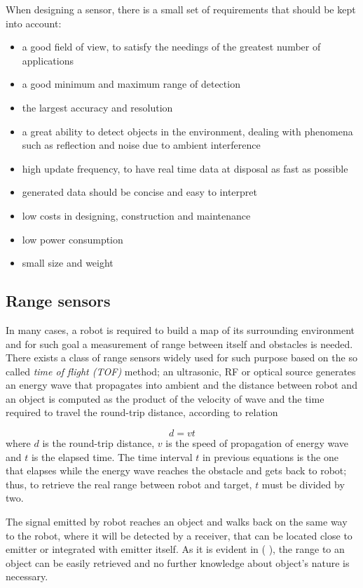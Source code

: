 \documentclass[a4paper, onecolumn]{report}
\begin{document}
When designing a sensor, there is a small set of requirements that should be kept into account:
\begin{itemize}
\item{a good field of view, to satisfy the needings of the greatest number of applications}
\item{a good minimum and maximum range of detection}
\item{the largest accuracy and resolution}
\item{a great ability to detect objects in the environment, dealing with phenomena such as reflection and noise due to ambient interference}
\item{high update frequency, to have real time data at disposal as fast as possible}
\item{generated data should be concise and easy to interpret}
\item{low costs in designing, construction and maintenance}
\item{low power consumption}
\item{small size and weight}
\end{itemize}

\subsection{Range sensors}
In many cases, a robot is required to build a map of its surrounding environment and for such goal a measurement of range between itself and obstacles is needed.
There exists a class of range sensors widely used for such purpose based on the so called \emph{time of flight (TOF)} method; an ultrasonic, RF or optical source generates an energy wave that propagates into ambient and the distance between robot and an object is computed as the product of the velocity of wave and the time required to travel the round-trip distance, according to relation

\begin{equation}
	d = vt
\end{equation}
where $d$ is the round-trip distance, $v$ is the speed of propagation of energy wave and $t$ is the elapsed time. The time interval $t$ in previous equations is the one that elapses while the energy wave reaches the obstacle and gets back to robot; thus, to retrieve the real range between robot and target, $t$ must be divided by two.

The signal emitted by robot reaches an object and walks back on the same way to the robot, where it will be detected by a receiver, that can be located close to emitter or integrated with emitter itself.
As it is evident in ( ), the range to an object can be easily retrieved and no further knowledge about object's nature is necessary.
\end{document}
